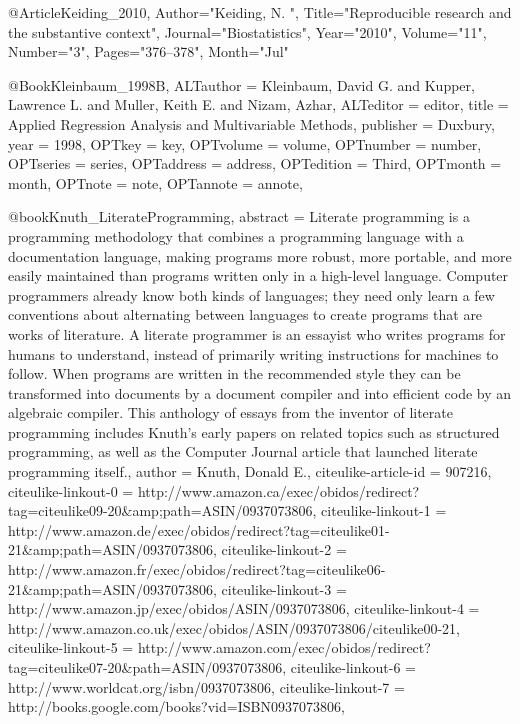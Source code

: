 {{{%

@Article{Keiding_2010,
   Author="Keiding, N. ",
   Title="{{R}eproducible research and the substantive context}",
   Journal="Biostatistics",
   Year="2010",
   Volume="11",
   Number="3",
   Pages="376--378",
   Month="Jul"
}

@Book{Kleinbaum_1998B,
ALTauthor = {Kleinbaum, David G. and Kupper, Lawrence L. and
Muller, Keith E. and Nizam, Azhar},
ALTeditor = {editor},
title = {Applied Regression Analysis and Multivariable 
Methods},
publisher = {Duxbury},
year = {1998},
OPTkey = {key},
OPTvolume = {volume},
OPTnumber = {number},
OPTseries = {series},
OPTaddress = {address},
OPTedition = {Third},
OPTmonth = {month},
OPTnote = {note},
OPTannote = {annote},
}


@book{Knuth_LiterateProgramming,
    abstract = {{Literate programming is a programming methodology that combines a programming language with a documentation language, making programs more robust, more portable, and more easily maintained than programs written only in a high-level language. Computer programmers already know both kinds of languages; they need only learn a few conventions about alternating between languages to create programs that are works of literature. A literate programmer is an essayist who writes programs for humans to understand, instead of primarily writing instructions for machines to follow. When programs are written in the recommended style they can be transformed into documents by a document compiler and into efficient code by an algebraic compiler. This anthology of essays from the inventor of literate programming includes Knuth's early papers on related topics such as structured programming, as well as the Computer Journal article that launched literate programming itself.}},
    author = {Knuth, Donald E.},
    citeulike-article-id = {907216},
    citeulike-linkout-0 = {http://www.amazon.ca/exec/obidos/redirect?tag=citeulike09-20\&amp;path=ASIN/0937073806},
    citeulike-linkout-1 = {http://www.amazon.de/exec/obidos/redirect?tag=citeulike01-21\&amp;path=ASIN/0937073806},
    citeulike-linkout-2 = {http://www.amazon.fr/exec/obidos/redirect?tag=citeulike06-21\&amp;path=ASIN/0937073806},
    citeulike-linkout-3 = {http://www.amazon.jp/exec/obidos/ASIN/0937073806},
    citeulike-linkout-4 = {http://www.amazon.co.uk/exec/obidos/ASIN/0937073806/citeulike00-21},
    citeulike-linkout-5 = {http://www.amazon.com/exec/obidos/redirect?tag=citeulike07-20\&path=ASIN/0937073806},
    citeulike-linkout-6 = {http://www.worldcat.org/isbn/0937073806},
    citeulike-linkout-7 = {http://books.google.com/books?vid=ISBN0937073806},
}}}}
